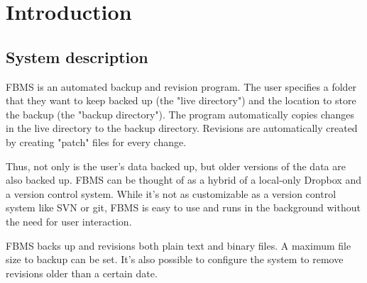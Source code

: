 \documentclass[12pt,a4paper]{article}
\begin{document}
\setcounter{tocdepth}{2}
\tableofcontents
\clearpage

\pagestyle{fancy}
\fancyhf{} %
\renewcommand{\headrulewidth}{0pt} %

\section{Introduction}

\subsection{System description}
FBMS is an automated backup and revision program. The user specifies a folder that they want to keep backed up (the "live directory") and the location to store the backup (the "backup directory"). The program automatically copies changes in the live directory to the backup directory. Revisions are automatically created by creating "patch" files for every change.

Thus, not only is the user's data backed up, but older versions of the data are also backed up. FBMS can be thought of as a hybrid of a local-only Dropbox\cite{dropbox} and a version control system. While it's not as customizable as a version control system like SVN\cite{svn} or git\cite{git}, FBMS is easy to use and runs in the background without the need for user interaction.

FBMS backs up and revisions both plain text and binary files. A maximum file size to backup can be set. It's also possible to configure the system to remove revisions older than a certain date.
\end{document}
